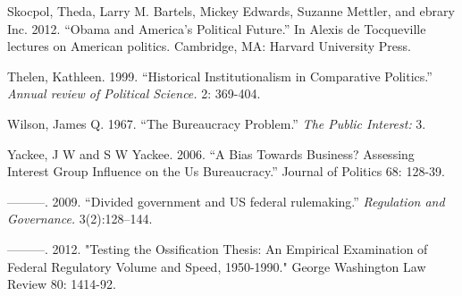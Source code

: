 Skocpol, Theda, Larry M. Bartels, Mickey Edwards, Suzanne Mettler, and ebrary Inc.  2012.  ``Obama and America's Political Future.''  In Alexis de Tocqueville lectures on American politics.  Cambridge, MA: Harvard University Press.



Thelen, Kathleen.  1999.  ``Historical Institutionalism in Comparative Politics.''  \textit{Annual review of Political Science.} 2: 369-404.






Wilson, James Q.  1967.  ``The Bureaucracy Problem.'' \textit\textit{The Public Interest:} 3.


Yackee, J W and S W Yackee.  2006.  ``A Bias Towards Business? Assessing Interest Group Influence on the Us Bureaucracy.''  Journal of Politics 68: 128-39.

———.  2009. ``Divided government and US federal rulemaking.'' \textit{Regulation and Governance.} 3(2):128–144.

———.  2012.  "Testing the Ossification Thesis: An Empirical Examination of Federal Regulatory Volume and Speed, 1950-1990."  George Washington Law Review 80: 1414-92.

